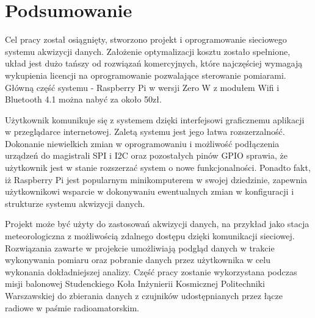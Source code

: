 \chapter{Podsumowanie}
\label{ch:podsumowanie}


Cel pracy został osiągnięty, stworzono projekt i oprogramowanie sieciowego systemu akwizycji danych. Założenie optymalizacji kosztu zostało spełnione, układ jest dużo tańszy od rozwiązań komercyjnych, które najczęściej wymagają wykupienia licencji na oprogramowanie pozwalające sterowanie pomiarami. Główną część systemu - Raspberry Pi w wersji Zero W z modułem Wifi i Bluetooth 4.1 można nabyć za około 50zł.

Użytkownik komunikuje się z systemem dzięki interfejsowi graficznemu aplikacji w przeglądarce internetowej. Zaletą systemu jest jego łatwa rozszerzalność. Dokonanie niewielkich zmian w oprogramowaniu i możliwość podłączenia urządzeń do magistrali SPI i I2C oraz pozostałych pinów GPIO sprawia, że użytkownik jest w stanie rozszerzać system o nowe funkcjonalności. Ponadto fakt, iż Raspberry Pi jest popularnym minikomputerem w swojej dziedzinie, zapewnia użytkownikowi wsparcie w dokonywaniu ewentualnych zmian w konfiguracji i strukturze systemu akwizycji danych. 

Projekt może być użyty do zastosowań akwizycji danych, na przykład jako stacja meteorologiczna z możliwością zdalnego dostępu dzięki komunikacji sieciowej. Rozwiązania zawarte w projekcie umożliwiają podgląd danych w trakcie wykonywania pomiaru oraz pobranie danych przez użytkownika w celu wykonania dokładniejszej analizy. Część pracy zostanie wykorzystana podczas misji balonowej Studenckiego Koła Inżynierii Kosmicznej Politechniki Warszawskiej do zbierania danych z czujników udostępnianych przez łącze radiowe w paśmie radioamatorskim.
